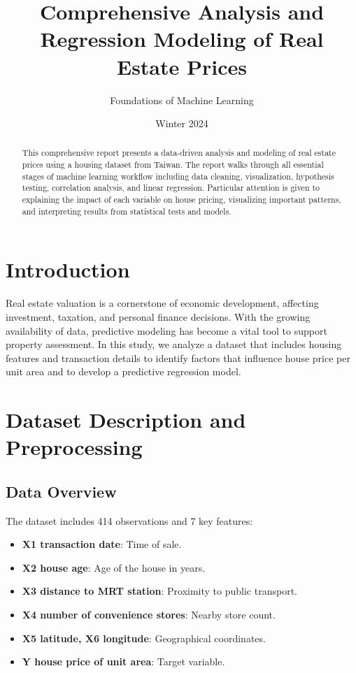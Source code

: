 \documentclass[12pt]{article}
\title{Comprehensive Analysis and Regression Modeling of Real Estate Prices}
\author{Foundations of Machine Learning}
\date{Winter 2024}
\begin{document}
\maketitle

\begin{abstract}
This comprehensive report presents a data-driven analysis and modeling of real estate prices using a housing dataset from Taiwan. The report walks through all essential stages of machine learning workflow including data cleaning, visualization, hypothesis testing, correlation analysis, and linear regression. Particular attention is given to explaining the impact of each variable on house pricing, visualizing important patterns, and interpreting results from statistical tests and models.
\end{abstract}

\section{Introduction}
Real estate valuation is a cornerstone of economic development, affecting investment, taxation, and personal finance decisions. With the growing availability of data, predictive modeling has become a vital tool to support property assessment. In this study, we analyze a dataset that includes housing features and transaction details to identify factors that influence house price per unit area and to develop a predictive regression model.

\section{Dataset Description and Preprocessing}
\subsection{Data Overview}
The dataset includes 414 observations and 7 key features:
\begin{itemize}
    \item \textbf{X1 transaction date}: Time of sale.
    \item \textbf{X2 house age}: Age of the house in years.
    \item \textbf{X3 distance to MRT station}: Proximity to public transport.
    \item \textbf{X4 number of convenience stores}: Nearby store count.
    \item \textbf{X5 latitude, X6 longitude}: Geographical coordinates.
    \item \textbf{Y house price of unit area}: Target variable.
\end{itemize}
\end{document}
